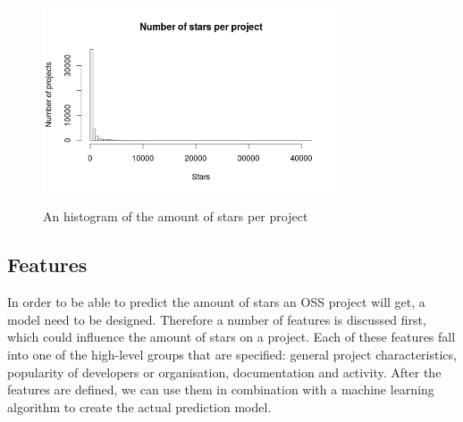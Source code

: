         \begin{figure}
            \includegraphics[width=250pt]{figures/star-distribution}
            \label{fig:star-distribution-plot}
            \caption{An histogram of the amount of stars per project}
        \end{figure}
    
    \subsection{Features}
    In order to be able to predict the amount of stars an OSS project will get, a model need to be designed.
    Therefore a number of features is discussed first, which could influence the amount of stars on a project.
    Each of these features fall into one of the high-level groups that are specified: general project characteristics, popularity of developers or organisation, documentation and activity.
    After the features are defined, we can use them in combination with a machine learning algorithm to create the actual prediction model.

